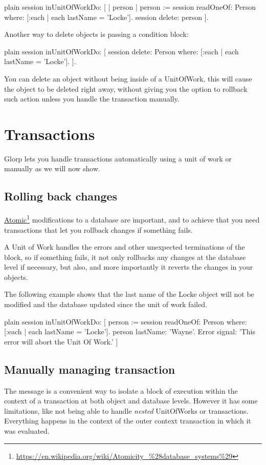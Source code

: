 \documentclass[10pt,twoside,english]{_support/latex/sbabook/sbabook}
\begin{document}
\begin{displaycode}{plain}
session inUnitOfWorkDo: [
	| person |
	person := session
		readOneOf: Person
		where: [:each | each lastName = 'Locke'].
	session delete: person
	].
\end{displaycode}

Another way to delete objects is passing a condition block:

\begin{displaycode}{plain}
session inUnitOfWorkDo: [
	session
		delete: Person
		where: [:each | each lastName = 'Locke'].
	].
\end{displaycode}

You can delete an object without being inside of a UnitOfWork, this will
cause the object to be deleted right away, without giving you the option
to rollback such action unless you handle the transaction manually.
\section{Transactions}
Glorp lets you handle transactions automatically using a unit of work or
manually as we will now show.
\subsection{Rolling back changes}
\href{https://en.wikipedia.org/wiki/Atomicity_%28database_systems%29}{Atomic}\footnote{\url{https://en.wikipedia.org/wiki/Atomicity_\%28database_systems\%29}}
modifications to a database are important, and to achieve that you need transactions
 that let you rollback changes if something fails.

A Unit of Work handles the errors and other unexpected terminations of
the block, so if something fails, it not only rollbacks any changes at the
database level if necessary, but also, and more importantly
it reverts the changes in your objects.

The following example shows that the last name of the Locke object will not be modified
and the database updated since the unit of work failed.

\begin{displaycode}{plain}
session inUnitOfWorkDo: [
	person := session
		readOneOf: Person
		where: [:each | each lastName = 'Locke'].
	person lastName: 'Wayne'.
	Error signal: 'This error will abort the Unit Of Work.'
	]
\end{displaycode}
\subsection{Manually managing transaction}
The  message is a convenient way to isolate a block of execution
within the context of a transaction at both object and database levels. However
it has some limitations, like not being able to handle \textit{nested} UnitOfWorks
or transactions. Everything happens in the context of the outer context transaction
in which it was evaluated.
\end{document}
